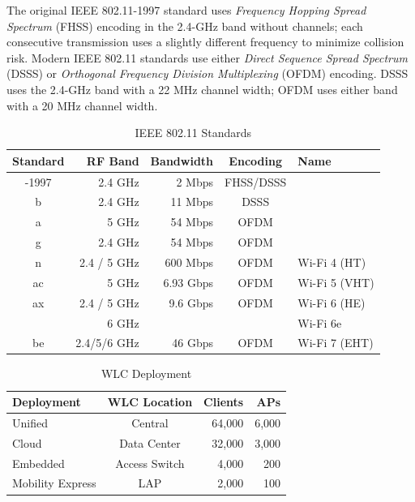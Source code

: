 \documentclass[12pt]{article}
\begin{document}
	The original IEEE 802.11-1997 standard uses \textit{Frequency Hopping Spread Spectrum} (FHSS) encoding in the 2.4-GHz band without channels; each consecutive transmission uses a slightly different frequency to minimize collision risk. Modern IEEE 802.11 standards use either \textit{Direct Sequence Spread Spectrum} (DSSS) or \textit{Orthogonal Frequency Division Multiplexing} (OFDM) encoding. DSSS uses the 2.4-GHz band with a 22 MHz channel width; OFDM uses either band with a 20 MHz channel width.

	\begin{table}[H]
	\centering
	\caption{IEEE 802.11 Standards \label{tab:802.11 STANDARDS}}
	\begin{tabular}{@{} c r r c l @{}}\hline
	\textbf{Standard}	& \textbf{RF Band}		& \textbf{Bandwidth}	& \textbf{Encoding}	& \textbf{Name}\\\hline
	-1997			& 2.4 GHz				& 2 Mbps			& FHSS/DSSS\\\hline
	b 			& 2.4 GHz 				& 11 Mbps			& DSSS\\\hline
	a 			& 5 GHz				& 54 Mbps 			& OFDM\\\hline
	g 			& 2.4 GHz				& 54 Mbps 			& OFDM\\\hline
	n 			& 2.4 / 5 GHz			& 600 Mbps		& OFDM 			& Wi-Fi 4 (HT)\\\hline
	ac 			& 5 GHz				& 6.93 Gbps		& OFDM			& Wi-Fi 5 (VHT)\\\hline
	ax			& 2.4 / 5 GHz			& 9.6 Gbps			& OFDM			& Wi-Fi 6 (HE)\\
				& 6 GHz				&				& 				& Wi-Fi 6e\\\hline
	be 			& 2.4/5/6 GHz			& 46 Gbps			& OFDM			& Wi-Fi 7 (EHT)\\\hline
	\end{tabular}\end{table}

	\begin{table}[H]
	\centering
	\caption{WLC Deployment \label{tab:WLC DEPLOYMENT}}
	\begin{tabular}{@{} l c r r @{}}\hline
	\textbf{Deployment}	& \textbf{WLC Location}	& \textbf{Clients}		& \textbf{APs}\\\hline
	Unified			& Central				& 64,000			& 6,000\\
	Cloud			& Data Center 			& 32,000			& 3,000\\
	Embedded			& Access Switch			& 4,000 			& 200\\
	Mobility Express		& LAP 				& 2,000			& 100\\\hline
	\end{tabular}\end{table}
\end{document}
